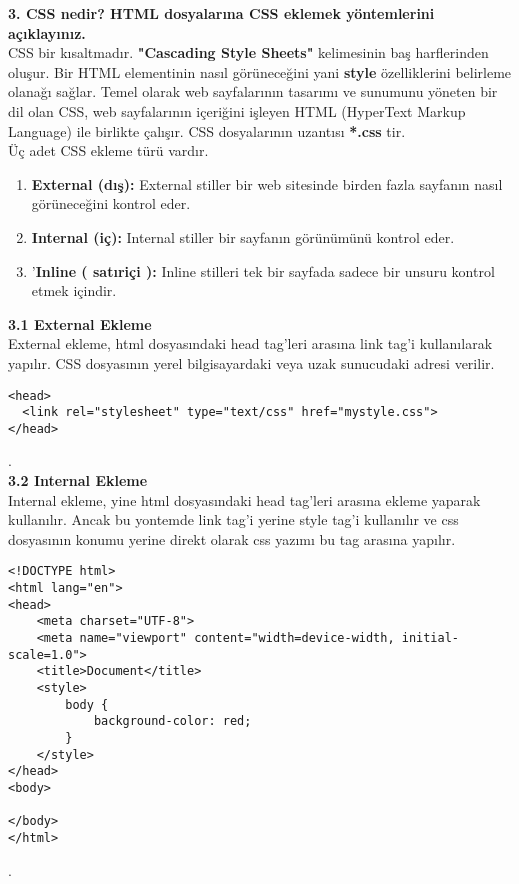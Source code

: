 \documentclass[a4paper,10pt]{article}
\begin{document}
\textbf{3. CSS nedir? HTML dosyalarına CSS eklemek yöntemlerini açıklayınız.}\\
    
CSS bir kısaltmadır. \textbf{"Cascading Style Sheets"} kelimesinin baş harflerinden oluşur. 
Bir HTML elementinin nasıl görüneceğini yani \textbf{style} özelliklerini belirleme olanağı sağlar.
Temel olarak web sayfalarının tasarımı ve sunumunu yöneten bir dil olan CSS,
 web sayfalarının içeriğini işleyen HTML (HyperText Markup Language) ile birlikte çalışır. CSS dosyalarının uzantısı \textbf{*.css} tir.\\
    
Üç adet CSS ekleme türü vardır.\\
    
\begin{enumerate}
  \item \textbf{External (dış):} External stiller bir web sitesinde birden fazla sayfanın nasıl görüneceğini kontrol eder.
  \item \textbf{Internal (iç):} Internal stiller bir sayfanın görünümünü kontrol eder.
  \item '\textbf{Inline ( satıriçi ):} Inline stilleri tek bir sayfada sadece bir unsuru kontrol etmek içindir.
\end{enumerate}
    
\pagebreak
  
\textbf{3.1 External Ekleme}\\

\quad External ekleme, html dosyasındaki head tag’leri arasına link tag’i kullanılarak yapılır. CSS dosyasının yerel bilgisayardaki veya uzak sunucudaki adresi verilir.
    
\begin{lstlisting}
<head>
  <link rel="stylesheet" type="text/css" href="mystyle.css">
</head>
\end{lstlisting}.\\
    
    
\textbf{3.2 Internal Ekleme}\\
    
Internal ekleme, yine html dosyasındaki head tag’leri arasına ekleme yaparak kullanılır. Ancak bu yontemde link tag’i yerine style tag’i kullanılır ve css dosyasının konumu yerine direkt olarak css yazımı bu tag arasına yapılır.
    
\begin{lstlisting}
<!DOCTYPE html>
<html lang="en">
<head>
    <meta charset="UTF-8">
    <meta name="viewport" content="width=device-width, initial-scale=1.0">
    <title>Document</title>
    <style>
        body {
            background-color: red;
        }
    </style>
</head>
<body>
    
</body>
</html>
\end{lstlisting}.\\
\end{document}
